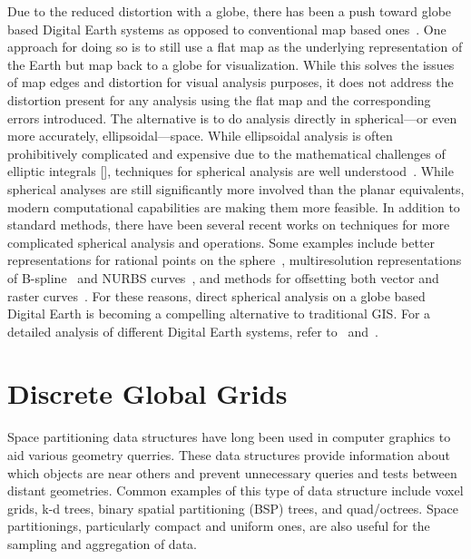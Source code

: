 Due to the reduced distortion with a globe, there has been a push toward globe based Digital Earth systems as opposed to conventional map based ones~\cite{goodchild2018reimagining}.
One approach for doing so is to still use a flat map as the underlying representation of the Earth but map back to a globe for visualization.
While this solves the issues of map edges and distortion for visual analysis purposes, it does not address the distortion present for any analysis using the flat map and the corresponding errors introduced.
The alternative is to do analysis directly in spherical---or even more accurately, ellipsoidal---space.
While ellipsoidal analysis is often prohibitively complicated and expensive due to the mathematical challenges of elliptic integrals [], techniques for spherical analysis are well understood~\cite{raskin1994spatial}.
While spherical analyses are still significantly more involved than the planar equivalents, modern computational capabilities are making them more feasible. 
In addition to standard methods, there have been several recent works on techniques for more complicated spherical analysis and operations.
Some examples include better representations for rational points on the sphere~\cite{bahrdt2017rational}, multiresolution representations of B-spline~\cite{alderson2016multiresolution} and NURBS curves~\cite{alderson2019multiscale}, and methods for offsetting both vector and raster curves~\cite{alderson2018offsetting}.
For these reasons, direct spherical analysis on a globe based Digital Earth is becoming a compelling alternative to traditional GIS. For a detailed analysis of different Digital Earth systems, refer to~\cite{mahdavi2015survey} and~\cite{alderson2020digital}.


\section{Discrete Global Grids}
Space partitioning data structures have long been used in computer graphics to aid various geometry querries.
These data structures provide information about which objects are near others and prevent unnecessary queries and tests between distant geometries.
Common examples of this type of data structure include voxel grids, k-d trees, binary spatial partitioning (BSP) trees, and quad/octrees.
Space partitionings, particularly compact and uniform ones, are also useful for the sampling and aggregation of data. 


